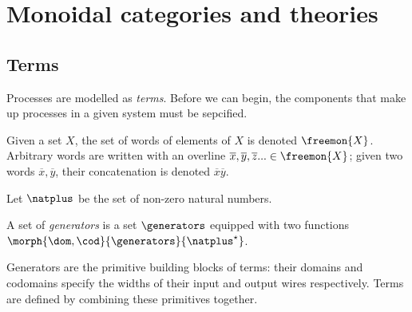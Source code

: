 \chapter{Monoidal categories and theories}

\section{Terms}

Processes are modelled as \emph{terms}.
Before we can begin, the components that make up processes in a given system
must be sepcified.

\begin{notation}[Words]
    Given a set \(X\), the set of words of elements of \(X\) is denoted
    \(\freemon{X}\).
    Arbitrary words are written with an overline \(
        \overline{x}, \overline{y}, \overline{z}... \in \freemon{X}
    \); given two words \(\overline{x}, \overline{y}\), their concatenation is
    denoted \(\overline{x}\overline{y}\).
\end{notation}

\begin{definition}
    Let \(\natplus\) be the set of non-zero natural numbers.
\end{definition}

\begin{definition}[Generators]
    A set of \emph{generators} is a set \(\generators\) equipped with two
    functions \(\morph{\dom,\cod}{\generators}{\natplus^\star}\).
\end{definition}

Generators are the primitive building blocks of terms: their domains and
codomains specify the widths of their input and output wires respectively.
Terms are defined by combining these primitives together.

